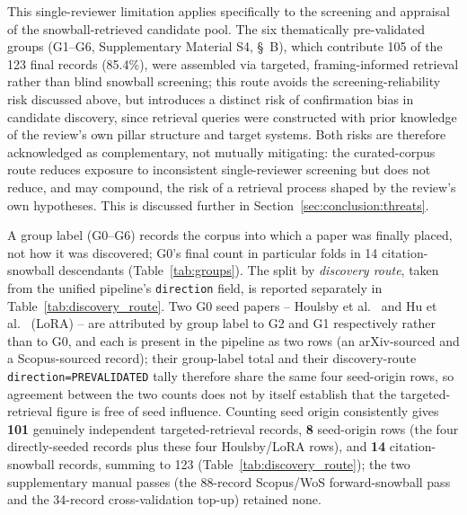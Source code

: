 This single-reviewer limitation applies specifically to the screening and
appraisal of the snowball-retrieved candidate pool. The six thematically
pre-validated groups (G1--G6, Supplementary Material S4, \S~B), which
contribute 105 of the 123 final records (85.4\%), were assembled via targeted,
framing-informed retrieval rather than blind snowball screening; this
route avoids the screening-reliability risk discussed above, but
introduces a distinct risk of confirmation bias in candidate discovery,
since retrieval queries were constructed with prior knowledge of the
review's own pillar structure and target systems. Both risks are
therefore acknowledged as complementary, not mutually mitigating: the
curated-corpus route reduces exposure to inconsistent single-reviewer
screening but does not reduce, and may compound, the risk of a
retrieval process shaped by the review's own hypotheses. This is
discussed further in Section~\ref{sec:conclusion:threats}.

A group label (G0--G6) records the corpus into which a paper was finally
placed, not how it was discovered; G0's final count in particular folds in
14 citation-snowball descendants (Table~\ref{tab:groups}). The split by
\emph{discovery route}, taken from the unified pipeline's \texttt{direction}
field, is reported separately in Table~\ref{tab:discovery_route}. Two G0 seed
papers -- Houlsby et al.~\cite{Houlsby2019} and Hu et al.~\cite{Hu2022}
(LoRA) -- are attributed by group label to G2 and G1 respectively rather than
to G0, and each is present in the pipeline as two rows (an arXiv-sourced and
a Scopus-sourced record); their group-label total and their discovery-route
\texttt{direction=PREVALIDATED} tally therefore share the same four
seed-origin rows, so agreement between the two counts does not by itself
establish that the targeted-retrieval figure is free of seed influence.
Counting seed origin consistently gives \textbf{101} genuinely independent
targeted-retrieval records, \textbf{8} seed-origin rows (the four
directly-seeded records plus these four Houlsby/LoRA rows), and \textbf{14}
citation-snowball records, summing to 123 (Table~\ref{tab:discovery_route});
the two supplementary manual passes (the 88-record Scopus/WoS forward-snowball
pass and the 34-record cross-validation top-up) retained none.

